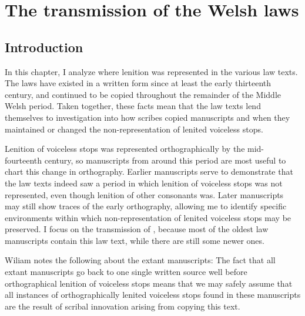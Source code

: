 
\chapter{The transmission of the Welsh laws}
\label{cha:welsh-laws}



% 



\section{Introduction}
\label{sec:introduction}

In this chapter, I analyze where lenition was represented in the various law texts.
The laws have existed in a written form since at least the early thirteenth century, and continued to be copied throughout the remainder of the Middle Welsh period. Taken together, these facts mean that the law texts lend themselves to investigation into how scribes copied manuscripts and when they maintained or changed the non-representation of lenited voiceless stops.

Lenition of voiceless stops was represented orthographically by the mid-fourteenth century, so manuscripts from around this period are most useful to chart this change in orthography.
Earlier manuscripts serve to demonstrate that the law texts indeed saw a period in which lenition of voiceless stops was not represented, even though lenition of other consonants was.
Later manuscripts may still show traces of the early orthography, allowing me to identify specific environments within which non-representation of lenited voiceless stops may be preserved.
I focus on the transmission of , because most of the oldest law manuscripts contain this law text, while there are still some newer ones.
 
Wiliam notes the following about the extant manuscripts:
The fact that all extant manuscripts go back to one single written source well before orthographical lenition of voiceless stops means that we may safely assume that all instances of orthographically lenited voiceless stops found in these manuscripts are the result of scribal innovation arising from copying this text. 

